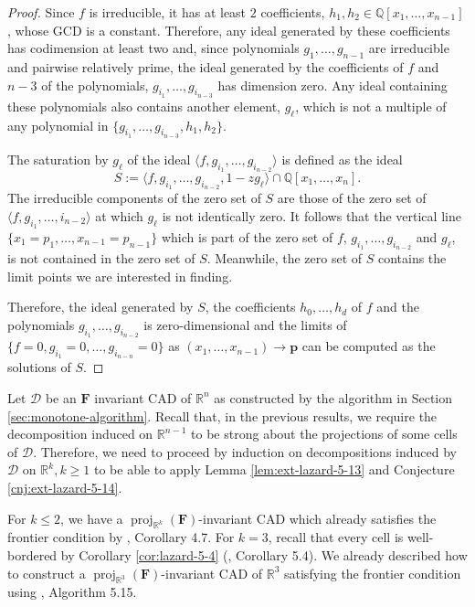 \documentclass[
]{book}
\theoremstyle{definition}
\theoremstyle{definition}
\theoremstyle{definition}
\theoremstyle{definition}
\theoremstyle{remark}
\begin{document}
\begin{proof}
Since \(f\) is irreducible, it has at least \(2\) coefficients, \(h_1,h_2 \in \mathbb{Q}[x_1,\ldots,x_{n-1}]\), whose GCD is a constant.
Therefore, any ideal generated by these coefficients has codimension at least two and, since polynomials \(g_1,\ldots,g_{n-1}\) are irreducible and pairwise relatively prime, the ideal generated by the coefficients of \(f\) and \(n-3\) of the polynomials, \(g_{i_1},\ldots,g_{i_{n-3}}\) has dimension zero.
Any ideal containing these polynomials also contains another element, \(g_\ell\), which is not a multiple of any polynomial in \(\{g_{i_1},\ldots,g_{i_{n-3}}, h_1,h_2\}\).

The saturation by \(g_\ell\) of the ideal \(\langle f, g_{i_1}, \ldots, g_{i_{n-2}} \rangle\) is defined as the ideal
\[
S := \langle f, g_{i_1}, \ldots, g_{i_{n-2}}, 1 - z g_\ell \rangle \cap \mathbb{Q}[x_1,\ldots,x_n].
\]
The irreducible components of the zero set of \(S\) are those of the zero set of \(\langle f,g_{i_1},\ldots,i_{n-2} \rangle\) at which \(g_\ell\) is not identically zero. It follows that the vertical line \(\{ x_1 = p_1, \ldots, x_{n-1} = p_{n-1} \}\) which is part of the zero set of \(f\),
\(g_{i_1},\ldots,g_{i_{n-2}}\) and \(g_\ell\), is not contained in the zero set of \(S\).
Meanwhile, the zero set of \(S\) contains the limit points we are interested in finding.

Therefore, the ideal generated by \(S\), the coefficients \(h_0,\ldots,h_d\) of \(f\) and the polynomials \(g_{i_1},\ldots,g_{i_{n-2}}\) is zero-dimensional and the limits of \(\{ f = 0, g_{i_1} = 0, \ldots, g_{i_{n-n}} = 0 \}\) as \((x_1,\ldots,x_{n-1}) \to \mathbf{p}\) can be computed as the solutions of \(S\).
\end{proof}

Let \(\mathcal{D}\) be an \(\mathbf{F}\) invariant CAD of \(\mathbb{R}^n\) as constructed by the algorithm in Section \ref{sec:monotone-algorithm}.
Recall that, in the previous results, we require the decomposition induced on \(\mathbb{R}^{n-1}\) to be strong about the projections of some cells of \(\mathcal{D}\). Therefore, we need to proceed by induction on decompositions induced by \(\mathcal{D}\) on \(\mathbb{R}^k, k \ge 1\) to be able to apply Lemma \ref{lem:ext-lazard-5-13} and Conjecture \ref{cnj:ext-lazard-5-14}.

For \(k\le 2\), we have a \({\operatorname{proj}_{\mathbb{R}^{k}}}(\mathbf{F})\)-invariant CAD which already satisfies the frontier condition by \citet{lazard10}, Corollary 4.7.
For \(k=3\), recall that every cell is well-bordered by Corollary \ref{cor:lazard-5-4} (\citet{lazard10}, Corollary 5.4). We already described how to construct a \({\operatorname{proj}_{\mathbb{R}^{3}}}(\mathbf{F})\)-invariant CAD of \(\mathbb{R}^3\) satisfying the frontier condition using \citet{lazard10}, Algorithm 5.15.
\end{document}
